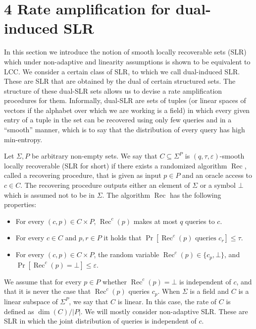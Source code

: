\section*{4 Rate amplification for dual-induced SLR}
In this section we introduce the notion of smooth locally recoverable sets (SLR) which under non-adaptive and linearity assumptions is shown to be equivalent to LCC. We consider a certain class of SLR, to which we call dual-induced SLR. These are SLR that are obtained by the dual of certain structured sets. The structure of these dual-SLR sets allows us to devise a rate amplification procedures for them. Informally, dual-SLR are sets of tuples (or linear spaces of vectors if the alphabet over which we are working is a field) in which every given entry of a tuple in the set can be recovered using only few queries and in a ``smooth'' manner, which is to say that the distribution of every query has high min-entropy.
\setcounter{nttheorem}{20}
\begin{ntdefinition}
Let $\Sigma,P$ be arbitrary non-empty sets. We say that $C\subseteq\Sigma^P$ is $(q,\tau,\varepsilon)$-smooth locally recoverable (SLR for short) if there exists a randomized algorithm $\operatorname{Rec}$, called a recovering procedure, that is given as input $p\in P$ and an oracle access to $c\in C$. The recovering procedure outputs either an element of $\Sigma$ or a symbol $\bot$ which is assumed not to be in $\Sigma$. The algorithm $\operatorname{Rec}$ has the following properties:
\begin{itemize}
\item For every $(c,p)\in C\times P$, $\operatorname{Rec}^c(p)$ makes at most $q$ queries to $c$.
\item For every $c\in C$ and $p,r\in P$ it holds that $\Pr[\operatorname{Rec}^c(p)\text{ queries }c_r]\leq\tau$.
\item For every $(c,p)\in C\times P$, the random variable $\operatorname{Rec}^c(p)\in\{c_p,\bot\}$, and $\Pr[\operatorname{Rec}^c(p)=\bot]\leq\varepsilon$.
\end{itemize}
We assume that for every $p\in P$ whether $\operatorname{Rec}^c(p)=\bot$ is independent of $c$, and that it is never the case that $\operatorname{Rec}^c(p)$ queries $c_p$. When $\Sigma$ is a field and $C$ is a linear subspace of $\Sigma^P$, we say that $C$ is linear. In this case, the rate of $C$ is defined as $\dim(C)/|P|$. We will mostly consider non-adaptive SLR. These are SLR in which the joint distribution of queries is independent of $c$.
\end{ntdefinition}
